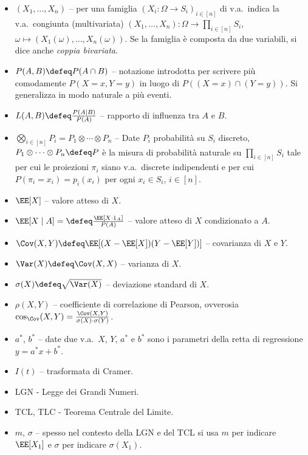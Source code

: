 \begin{multicols*}{2}
\begin{itemize}
        \item $(X_1, \ldots, X_n)$ -- per una famiglia $(X_i : \Omega \to S_i)_{i \in [n]}$ di
        v.a.~indica la v.a.~congiunta (multivariata) $(X_1, \ldots, X_n) : \Omega \to \prod_{i \in [n]} S_i$, $\omega \mapsto (X_1(\omega), \ldots, X_n(\omega))$. Se la
        famiglia è composta da due variabili, si dice anche \textit{coppia bivariata}.
        \item $P(A, B) \defeq P(A \cap B)$ -- notazione introdotta per scrivere
        più comodamente $P(X = x, Y = y)$ in luogo di $P((X = x) \cap (Y = y))$. Si
        generalizza in modo naturale a più eventi.
        \item $L(A, B) \defeq \frac{P(A \mid B)}{P(A)}$ -- rapporto di influenza tra
        $A$ e $B$.
        \item $\bigotimes_{i \in [n]} P_i = P_1 \otimes \cdots \otimes P_n$ --
        Date $P_i$ probabilità su $S_i$ discreto, $P_1 \otimes \cdots \otimes P_n \defeq P$ è la misura di probabilità naturale su $\prod_{i \in [n]} S_i$ tale per cui
        le proiezioni $\pi_i$ siano v.a.~discrete indipendenti e per cui
        $P(\pi_i = x_i) = p_i(x_i)$ per ogni $x_i \in S_i$, $i \in [n]$.
        \item $\EE[X]$ -- valore atteso di $X$.
        \item $\EE[X \mid A] = \defeq \frac{\EE[X \cdot 1_A]}{P(A)}$ -- valore atteso di $X$
        condizionato a $A$.
        \item $\Cov(X, Y) \defeq \EE[(X - \EE[X])(Y - \EE[Y])]$ -- covarianza di $X$ e $Y$.
        \item $\Var(X) \defeq \Cov(X, X)$ -- varianza di $X$.
        \item $\sigma(X) \defeq \sqrt{\Var(X)}$ -- deviazione standard di $X$.
        \item $\rho(X, Y)$ -- coefficiente
        di correlazione di Pearson, ovverosia
        $\cos_{\Cov}(X, Y) = \frac{\Cov(X, Y)}{\sigma(X) \cdot \sigma(Y)}$.
        \item $a^*$, $b^*$ -- date due
        v.a.~$X$, $Y$, $a^*$ e $b^*$ sono
        i parametri della retta di
        regressione $y = a^*x + b^*$.
        \item $I(t)$ -- trasformata di Cramer.
        \item LGN - Legge dei Grandi Numeri.
        \item TCL, TLC - Teorema Centrale del Limite.
        \item $m$, $\sigma$ -- spesso nel contesto
        della LGN e del TCL si usa $m$ per
        indicare $\EE[X_1]$ e $\sigma$ per
        indicare $\sigma(X_1)$.
    \end{itemize}
\end{multicols*}
